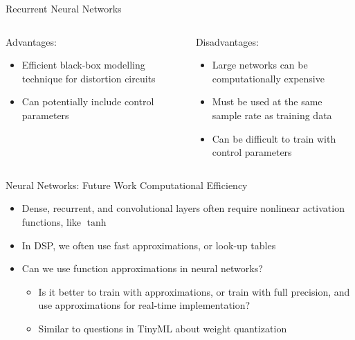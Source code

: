 \begin{frame}{Recurrent Neural Networks}
    \begin{columns}
        \begin{column}{0.5\linewidth}
            \hspace{-1ex}
            Advantages:
            \vspace{1ex}
            \begin{itemize}
                \itemsep0.5em
                \item Efficient black-box modelling technique for distortion circuits
                \item Can potentially include control parameters
            \end{itemize}
        \end{column}
        \begin{column}{0.5\linewidth}
            \hspace{-1ex}
            Disadvantages:
            \vspace{1ex}
            \begin{itemize}
                \itemsep0.5em
                \item Large networks can be computationally expensive
                \item Must be used at the same sample rate as training data
                \item Can be difficult to train with control parameters
            \end{itemize}
        \end{column}
    \end{columns}
\end{frame}

\begin{frame}{Neural Networks: Future Work}
    Computational Efficiency
    \begin{itemize}
        \itemsep0.5em
        \item Dense, recurrent, and convolutional layers often require nonlinear activation functions, like $\tanh$
        \item In DSP, we often use fast approximations, or look-up tables
        \item Can we use function approximations in neural networks?
        \begin{itemize}
            \itemsep0em
            \item Is it better to train with approximations, or train with full precision, and use approximations for real-time implementation?
            \item Similar to questions in TinyML about weight quantization
        \end{itemize}
    \end{itemize}
\end{frame}


